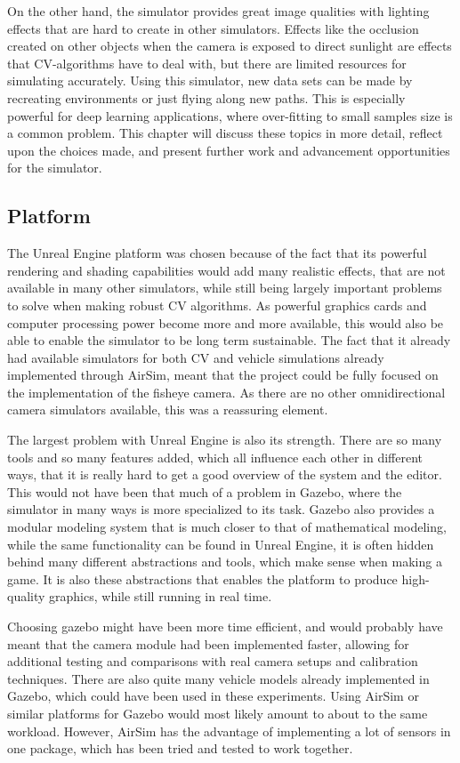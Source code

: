 On the other hand, the simulator provides great image qualities with lighting effects that are hard to create in other simulators. Effects like the occlusion created on other objects when the camera is exposed to direct sunlight are effects that CV-algorithms have to deal with, but there are limited resources for simulating accurately. Using this simulator, new data sets can be made by recreating environments or just flying along new paths. This is especially powerful for deep learning applications, where over-fitting to small samples size is a common problem. This chapter will discuss these topics in more detail, reflect upon the choices made, and present further work and advancement opportunities for the simulator. 

\subsection{Platform}

The Unreal Engine platform was chosen because of the fact that its powerful rendering and shading capabilities would add many realistic effects, that are not available in many other simulators, while still being largely important problems to solve when making robust CV algorithms. As powerful graphics cards and computer processing power become more and more available, this would also be able to enable the simulator to be long term sustainable. The fact that it already had available simulators for both CV and vehicle simulations already implemented through AirSim, meant that the project could be fully focused on the implementation of the fisheye camera. As there are no other omnidirectional camera simulators available, this was a reassuring element.

The largest problem with Unreal Engine is also its strength. There are so many tools and so many features added, which all influence each other in different ways, that it is really hard to get a good overview of the system and the editor. This would not have been that much of a problem in Gazebo, where the simulator in many ways is more specialized to its task. Gazebo also provides a modular modeling system that is much closer to that of mathematical modeling, while the same functionality can be found in Unreal Engine, it is often hidden behind many different abstractions and tools, which make sense when making a game. It is also these abstractions that enables the platform to produce high-quality graphics, while still running in real time.

Choosing gazebo might have been more time efficient, and would probably have meant that the camera module had been implemented faster, allowing for additional testing and comparisons with real camera setups and calibration techniques. There are also quite many vehicle models already implemented in Gazebo, which could have been used in these experiments. Using AirSim or similar platforms for Gazebo would most likely amount to about to the same workload. However, AirSim has the advantage of implementing a lot of sensors in one package, which has been tried and tested to work together.


